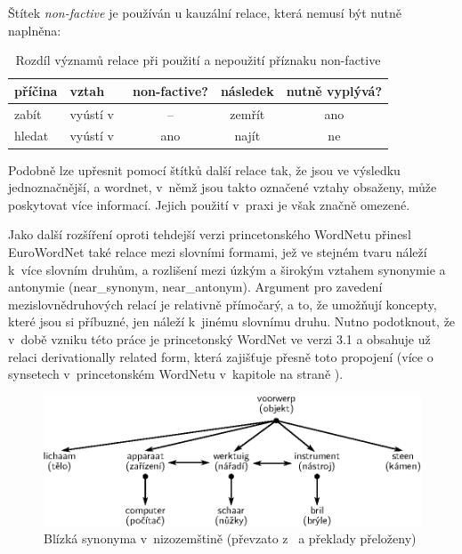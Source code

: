 \documentclass[a4paper,11pt,openany,twoside]{book}
\newcommand{\itNameRef}[1]{\textit{\nameref{#1}}}
\newcommand\ex{\textsf}
\begin{document}
				Štítek \textit{non-factive} je používán u kauzální relace, která nemusí být nutně naplněna:


					\begin{table}[h!]
						\centering
						\label{tab:wnlabels}
						\begin{tabular}{llcc|c}
							\textbf{příčina}	& \textbf{vztah}  & \textbf{non-factive?} & \textbf{následek} & \textbf{nutně vyplývá?} \\ \hline
							\ex{zabít}  & vyústí v~& –  & \ex{zemřít} & ano                       \\
							\ex{hledat} & vyústí v~& ano & \ex{najít}  & ne
						\end{tabular}
						\caption{Rozdíl významů relace při použití a nepoužití příznaku \ex{non-factive}}
					\end{table}

				Podobně lze upřesnit pomocí štítků další relace tak, že jsou ve výsledku jednoznačnější, a wordnet, v~němž jsou takto označené vztahy obsaženy, může poskytovat více informací. Jejich použití v~praxi je však značně omezené. \parencite{rambousek2017Ustni}


				Jako další rozšíření oproti tehdejší verzi princetonského WordNetu přinesl EuroWordNet také relace mezi slovními formami, jež ve stejném tvaru náleží k~více slovním druhům, a rozlišení mezi úzkým a širokým vztahem synonymie a antonymie (\ex{near\_synonym}, \ex{near\_antonym}). Argument pro zavedení mezislovnědruhových relací je relativně přímočarý, a to, že umožňují  koncepty, které jsou si příbuzné, jen náleží k~jinému slovnímu druhu. Nutno podotknout, že v~době vzniku této práce je princetonský WordNet ve verzi 3.1 a obsahuje už relaci \ex{derivationally related form}, která zajišťuje přesně toto propojení (více o synsetech v~princetonském WordNetu v~kapitole \itNameRef{cha:princeton-synset-rels} na straně \pageref{cha:princeton-synset-rels}). 

				\begin{figure}[h]
					\centering
					\includegraphics[width=1.0\textwidth]{pazienza-wn-study.eps}
					\caption{Blízká synonyma v~nizozemštině (převzato z~\textcite{pazienza2008bottom} a překlady přeloženy)}
					\label{fig:near-synon}
				\end{figure}
\end{document}
